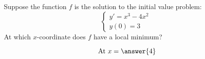 \documentclass{ximera}
\author{Bobby Ramsey}
\begin{document}
\begin{exercise}
Suppose the function $f$ is the solution to the initial value problem:
\[  \begin{cases}
	y' = x^3 - 4x^2\\
	y(0) = 3
\end{cases}\]
At which $x$-coordinate does $f$ have a local minimum?

\[ \text{ At } x = \answer{4} \]

\end{exercise}
\end{document}
